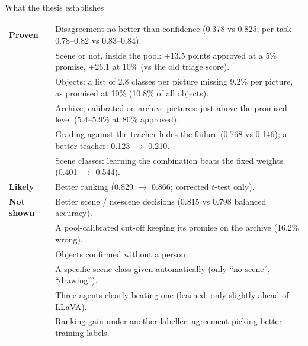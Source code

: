 \documentclass[aspectratio=169,11pt]{beamer}
\renewcommand{\arraystretch}{1.3}
\newcommand{\yes}[1]{\textcolor{accent}{\textbf{#1}}}
\newcommand{\no}[1]{\textcolor{warn}{\textbf{#1}}}
\newcommand{\remark}[1]{\par\vspace{0.35cm}{\small\textcolor{grey}{#1}}}
\begin{document}
\begin{frame}{What the thesis establishes}
\footnotesize\renewcommand{\arraystretch}{0.88}\begin{tabular}{@{}L{2.2cm} L{11.0cm}@{}}
\toprule
\yes{Proven} & Disagreement no better than confidence (0.378 vs 0.825; per task 0.78--0.82 vs 0.83--0.84).\\
 & Scene or not, inside the pool: +13.5 points approved at a 5\% promise, +26.1 at 10\% (vs the old triage score).\\
 & Objects: a list of 2.8 classes per picture missing 9.2\% per picture, as promised at 10\% (10.8\% of all objects).\\
 & Archive, calibrated on archive pictures: just above the promised level (5.4--5.9\% at 80\% approved).\\
 & Grading against the teacher hides the failure (0.768 vs 0.146); a better teacher: 0.123 $\to$ 0.210.\\
 & Scene classes: learning the combination beats the fixed weights (0.401 $\to$ 0.544).\\
\midrule
\textbf{Likely} & Better ranking (0.829 $\to$ 0.866; corrected $t$-test only).\\
\midrule
\no{Not shown} & Better scene / no-scene decisions (0.815 vs 0.798 balanced accuracy).\\
 & A pool-calibrated cut-off keeping its promise on the archive (16.2\% wrong).\\
 & Objects confirmed without a person.\\
 & A specific scene class given automatically (only ``no scene'', ``drawing'').\\
 & Three agents clearly beating one (learned: only slightly ahead of LLaVA).\\
 & Ranking gain under another labeller; agreement picking better training labels.\\
\bottomrule
\end{tabular}
\remark{Not a better detector: a tested account of when an automatic answer can be trusted.}
\end{frame}
\end{document}
